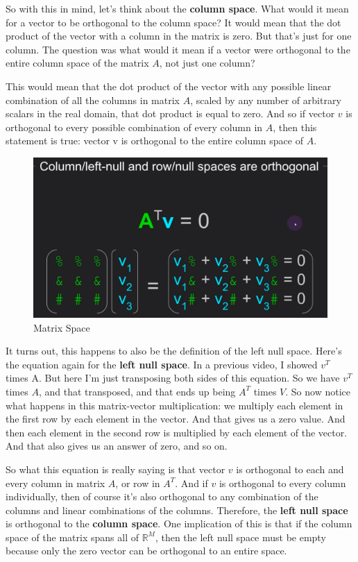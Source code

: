 \documentclass[fleqn,10pt]{olplainarticle}
\theoremstyle{definition}
\theoremstyle{remark}
\begin{document}
So with this in mind, let's think about the \textbf{column space}. What would it mean for a vector to be orthogonal to the column space? It would mean that the dot product of the vector with a column in the matrix is zero. But that's just for one column. The question was what would it mean if a vector were orthogonal to the entire column space of the matrix $A$, not just one column?

This would mean that the dot product of the vector with any possible linear combination of all the columns in matrix $A$, scaled by any number of arbitrary scalars in the real domain, that dot product is equal to zero. And so if vector $v$ is orthogonal to every possible combination of every column in $A$, then this statement is true: vector v is orthogonal to the entire column space of $A$. 

\begin{figure}[ht]
	\centering
	\includegraphics[width=0.6\linewidth]{images/matrix-space-28.png}
	\caption{Matrix Space}
	\label{fig:matrix_space_28}
\end{figure}

It turns out, this happens to also be the definition of the left null space. Here's the equation again for the \textbf{left null space}. In a previous video, I showed $v^T$ times A. But here I'm just transposing both sides of this equation. So we have $v^T$ times $A$, and that transposed, and that ends up being $A^T$ times $V$. So now notice what happens in this matrix-vector multiplication: we multiply each element in the first row by each element in the vector. And that gives us a zero value. And then each element in the second row is multiplied by each element of the vector. And that also gives us an answer of zero, and so on.

So what this equation is really saying is that vector $v$ is orthogonal to each and every column in matrix $A$, or row in $A^T$. And if $v$ is orthogonal to every column individually, then of course it's also orthogonal to any combination of the columns and linear combinations of the columns. Therefore, the \textbf{left null space} is orthogonal to the \textbf{column space}. One implication of this is that if the column space of the matrix spans all of $\mathbb{R}^M$, then the left null space must be empty because only the zero vector can be orthogonal to an entire space.
\end{document}
